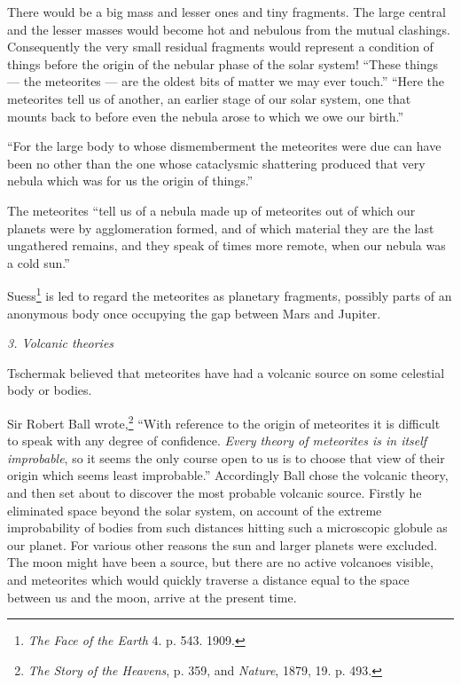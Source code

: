 \documentclass[a4paper, 12pt, oneside]{article}
\begin{document}
There would be a big mass and lesser ones and tiny fragments. The large central and the lesser masses would become hot and nebulous from the mutual clashings. Consequently the very small residual fragments would represent a condition of things before the origin of the nebular phase of the solar system! ``These things --- the meteorites --- are the oldest bits of matter we may ever touch.'' ``Here the meteorites tell us of another, an earlier stage of our solar system, one that mounts back to before even the nebula arose to which we owe our birth.''

``For the large body to whose dismemberment the meteorites were due can have been no other than the one whose cataclysmic shattering produced that very nebula which was for us the origin of things.''

The meteorites ``tell us of a nebula made up of meteorites out of which our planets were by agglomeration formed, and of which material they are the last ungathered remains, and they speak of times more remote, when our nebula was a cold sun.''

Suess\footnote{\emph{The Face of the Earth} 4. p. 543. 1909.} is led to regard the meteorites as planetary fragments, possibly parts of an anonymous body once occupying the gap between Mars and Jupiter.

\bigskip
\centerline{\emph{3. Volcanic theories}}

Tschermak believed that meteorites have had a volcanic source on some celestial body or bodies.

Sir Robert Ball wrote,\footnote{\emph{The Story of the Heavens}, p. 359, and \emph{Nature}, 1879, 19. p. 493.} ``With reference to the origin of meteorites it is difficult to speak with any degree of confidence. \emph{Every theory of meteorites is in itself improbable}, so it seems the only course open to us is to choose that view of their origin which seems least improbable.'' Accordingly Ball chose the volcanic theory, and then set about to discover the most probable volcanic source. Firstly he eliminated space beyond the solar system, on account of the extreme improbability of bodies from such distances hitting such a microscopic globule as our planet. For various other reasons the sun and larger planets were excluded. The moon might have been a source, but there are no active volcanoes visible, and meteorites which would quickly traverse a distance equal to the space between us and the moon, arrive at the present time.
\end{document}
